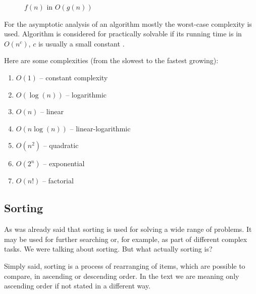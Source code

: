 \documentclass[
  field=inf,
  biblatex,
  language=english,
  glossaries,
  theorems=false,
  sourcecodes=false,
  index
]{kidiplom}
\begin{document}
\begin{figure}[H]
	\begin{center}
		\caption{$f(n)$ in $O(g(n))$} \label{fig:big-omega}
	\end{center}
\end{figure}

For the asymptotic analysis of an algorithm mostly the worst-case complexity is used. Algorithm is considered for practically solvable if its running time is in $O(n^c)$, $c$ is usually a small constant \cite{cormen}. 

Here are some complexities (from the slowest to the fastest growing):
\begin{enumerate}
 \item $O(1)$ -- constant complexity
 \item $O(\log(n))$ -- logarithmic
 \item $O(n)$ -- linear
 \item $O(n \log(n))$ -- linear-logarithmic
 \item $O(n^2)$ -- quadratic
 \item $O(2^n)$ -- exponential
 \item $O(n!)$ -- factorial
\end{enumerate}

\subsection{Sorting}

As was already said that sorting is used for solving a wide range of problems. It may be used for further searching or, for example, as part of different complex tasks. We were talking about sorting. But what actually sorting is?

Simply said, sorting is a process of rearranging of items, which are possible to compare, in ascending or descending order. In the text we are meaning only ascending order if not stated in a different way.
\end{document}
